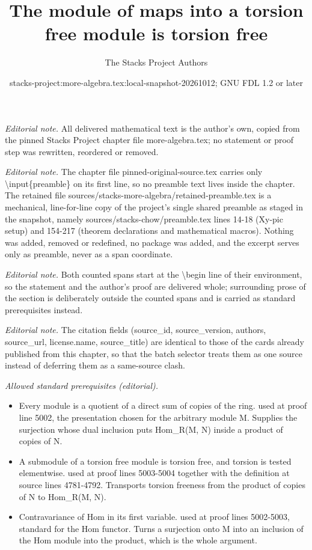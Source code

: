 \documentclass[10pt,a4paper]{amsart}
\title{The module of maps into a torsion free module is torsion free}
\author{The Stacks Project Authors}
\date{stacks-project:more-algebra.tex:local-snapshot-20261012; GNU FDL 1.2 or later}
\theoremstyle{plain}
\theoremstyle{definition}
\theoremstyle{remark}
\numberwithin{equation}{subsection}
\begin{document}
\maketitle
\setcounter{subsection}{1}
\noindent\textit{Editorial note.} All delivered mathematical text is the author's own, copied from the pinned Stacks Project chapter file more-algebra.tex; no statement or proof step was rewritten, reordered or removed.\par\medskip
\noindent\textit{Editorial note.} The chapter file pinned-original-source.tex carries only \textbackslash{}input\{preamble\} on its first line, so no preamble text lives inside the chapter. The retained file sources/stacks-more-algebra/retained-preamble.tex is a mechanical, line-for-line copy of the project's single shared preamble as staged in the snapshot, namely sources/stacks-chow/preamble.tex lines 14-18 (Xy-pic setup) and 154-217 (theorem declarations and mathematical macros). Nothing was added, removed or redefined, no package was added, and the excerpt serves only as preamble, never as a span coordinate.\par\medskip
\noindent\textit{Editorial note.} Both counted spans start at the \textbackslash{}begin line of their environment, so the statement and the author's proof are delivered whole; surrounding prose of the section is deliberately outside the counted spans and is carried as standard prerequisites instead.\par\medskip
\noindent\textit{Editorial note.} The citation fields (source\_id, source\_version, authors, source\_url, license.name, source\_title) are identical to those of the cards already published from this chapter, so that the batch selector treats them as one source instead of deferring them as a same-source clash.\par\medskip
\noindent\textit{Allowed standard prerequisites (editorial).}\begin{itemize}
\item Every module is a quotient of a direct sum of copies of the ring. used at proof line 5002, the presentation chosen for the arbitrary module M. Supplies the surjection whose dual inclusion puts Hom\_R(M, N) inside a product of copies of N.
\item A submodule of a torsion free module is torsion free, and torsion is tested elementwise. used at proof lines 5003-5004 together with the definition at source lines 4781-4792. Transports torsion freeness from the product of copies of N to Hom\_R(M, N).
\item Contravariance of Hom in its first variable. used at proof lines 5002-5003, standard for the Hom functor. Turns a surjection onto M into an inclusion of the Hom module into the product, which is the whole argument.
\end{itemize}\medskip
\end{document}
